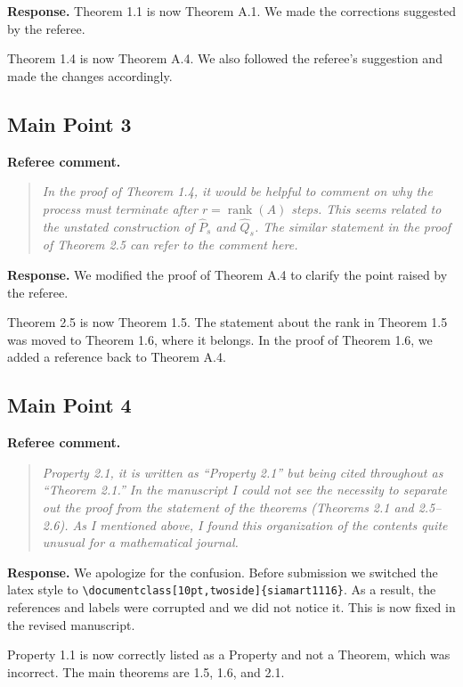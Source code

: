 \documentclass[11pt]{article}
\newenvironment{refereecomment}
{\par\smallskip\noindent\textbf{\color{commentblue}Referee comment.}
\begin{quote}\itshape}
  {
\end{quote}}
\newenvironment{authorresponse}
{\par\smallskip\noindent\textbf{\color{responsegreen}Response.}}
{\par\smallskip}
\begin{document}
\begin{authorresponse}
  Theorem 1.1 is now Theorem A.1. We made the corrections suggested by the referee.

  Theorem 1.4 is now Theorem A.4. We also followed the referee's suggestion and made the changes accordingly.
\end{authorresponse}

\subsection*{Main Point 3}

\begin{refereecomment}
  In the proof of Theorem 1.4, it would be helpful to comment on why the process must terminate after $r = \operatorname{rank}(A)$ steps. This seems related to the unstated construction of $\widehat{P}_s$ and $\widehat{Q}_s$. The similar statement in the proof of Theorem 2.5 can refer to the comment here.
\end{refereecomment}

\begin{authorresponse}
  We modified the proof of Theorem A.4 to clarify the point raised by the referee.

  Theorem 2.5 is now Theorem 1.5. The statement about the rank in Theorem 1.5 was moved to Theorem 1.6, where it belongs. In the proof of Theorem 1.6, we added a reference back to Theorem A.4.
\end{authorresponse}

\subsection*{Main Point 4}

\begin{refereecomment}
  Property 2.1, it is written as “Property 2.1” but being cited throughout as “Theorem 2.1.” In the manuscript I could not see the necessity to separate out the proof from the statement of the theorems (Theorems 2.1 and 2.5–2.6). As I mentioned above, I found this organization of the contents quite unusual for a mathematical journal.
\end{refereecomment}

\begin{authorresponse}
  We apologize for the confusion. Before submission we switched the latex style to \verb|\documentclass[10pt,twoside]{siamart1116}|. As a result, the references and labels were corrupted and we did not notice it. This is now fixed in the revised manuscript.

  Property 1.1 is now correctly listed as a Property and not a Theorem, which was incorrect. The main theorems are 1.5, 1.6, and 2.1.
\end{authorresponse}
\end{document}

